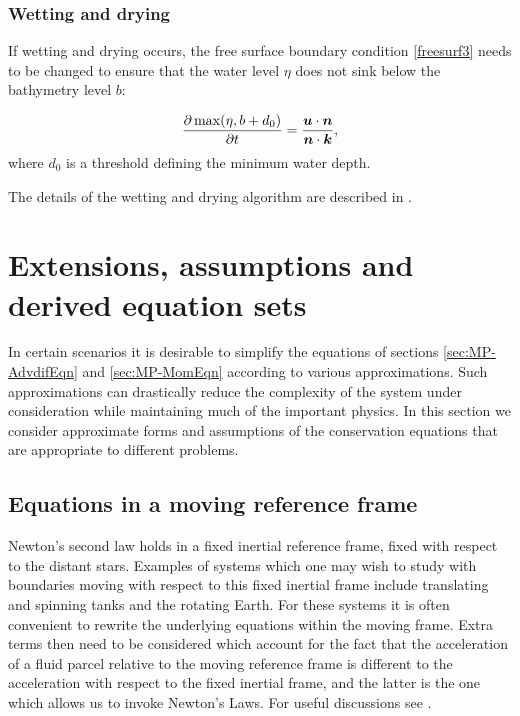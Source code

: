 \subsubsection{Wetting and drying}\label{sec:WD}
If wetting and drying occurs, the free surface boundary condition \ref{freesurf3} needs to be changed to ensure that the water level $\eta$ does not sink below the bathymetry level $b$:

\begin{equation}\label{eq:wd1}
\frac{\partial \max(\eta, b+d_0)}{\partial t}=\frac{{\mbox{\boldmath$u$}} \cdot {\mbox{\boldmath$n$}}}{{\mbox{\boldmath$n$}} \cdot {\mbox{\boldmath$k$}}},
\end{equation}
where $d_0$ is a threshold defining the minimum water depth.

The details of the wetting and drying algorithm are described in \cite{Funke2011}.

\section{Extensions, assumptions and derived equation sets}\label{sec:eqn_extensions}

In certain scenarios it is desirable to simplify the equations of sections \ref{sec:MP-AdvdifEqn} and \ref {sec:MP-MomEqn} according to various approximations. Such approximations can drastically reduce the complexity of the system under consideration while maintaining much of the important physics. In this section we consider approximate forms and assumptions of the conservation equations that are appropriate to different problems. 

\subsection{Equations in a moving reference frame}\label{sec:coriolis}
Newton's second law holds in a fixed inertial reference frame, \ie
fixed with respect to the distant stars. 
Examples of systems which one may wish to study with boundaries moving
with respect to this fixed inertial frame include translating and spinning tanks
and the rotating Earth. For these systems it is often convenient to rewrite the 
underlying equations within the moving frame. Extra terms then need to be considered 
which account for the fact that the acceleration of a fluid parcel relative to the 
moving reference frame is different to the acceleration with respect to the fixed 
inertial frame, and the latter is the one which allows us to invoke Newton's Laws.
For useful discussions see \citep{batchelor1967,cushman1994,gill1982}.


